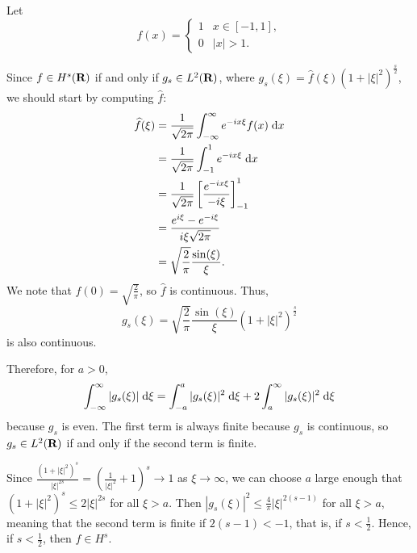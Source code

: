 \documentclass{homework}
\begin{document}
	\maketitle
	
	Let
	\begin{equation}
		f(x) = \begin{cases}
			1 & x \in [-1, 1], \\
			0 & |x| > 1.
		\end{cases}
	\end{equation}
	
	\question Since $f \in H^s(\textnormal{\bf R})$ if and only if $g_s \in L^2(\textnormal{\bf R})$, where $g_s(\xi) = \widehat{f}(\xi)(1+|\xi|^2)^\frac{s}{2}$, we should start by computing $\widehat{f}$:
	\begin{align*}
		\widehat{f}(\xi) &= \frac{1}{\sqrt{2\pi}} \int_{-\infty}^\infty e^{-ix\xi}f(x)\;\text{d} x \\
		&= \frac{1}{\sqrt{2\pi}}\int_{-1}^1 e^{-ix\xi}\;\text{d} x \\
		&= \frac{1}{\sqrt{2\pi}}\left[\frac{e^{-ix\xi}}{-i\xi}\right]_{-1}^1 \\
		&= \frac{e^{i\xi} - e^{-i\xi}}{i\xi\sqrt{2\pi}}\\
		&= \sqrt{\frac{2}{\pi}}\frac{\sin(\xi)}{\xi}.
	\end{align*}
	We note that $\widehat{f}(0) = \sqrt{\frac{2}{\pi}}$, so $\widehat{f}$ is continuous. Thus,
	\begin{equation*}
		g_s(\xi) =\sqrt{\frac{2}{\pi}}\frac{\sin(\xi)}{\xi}(1+|\xi|^2)^\frac{s}{2}
	\end{equation*}
	is also continuous.
	
	Therefore, for $a > 0$,
	\begin{equation*}
		\int_{-\infty}^\infty |g_s(\xi)|\;\text{d}\xi = \int_{-a}^a |g_s(\xi)|^2\;\text{d}\xi + 2\int_{a}^\infty |g_s(\xi)|^2\;\text{d} \xi
	\end{equation*}
	because $g_s$ is even. The first term is always finite because $g_s$ is continuous, so $g_s \in L^2(\textnormal{\bf R})$ if and only if the second term is finite.
	
	Since $\frac{(1+|\xi|^2)^s}{|\xi|^{2s}} = \left(\frac{1}{|\xi|^2} + 1\right)^s \to 1$ as $\xi \to \infty$, we can choose $a$ large enough that $(1+|\xi|^2)^s \le 2|\xi|^{2s}$ for all $\xi > a$. Then $|g_s(\xi)|^2 \le \frac{4}{\pi}|\xi|^{2(s-1)}$ for all $\xi > a$, meaning that the second term is finite if $2(s-1) < -1$, that is, if $s < \frac{1}{2}$. Hence, if $s < \frac{1}{2}$, then $f \in H^s$.
	
\end{document}
